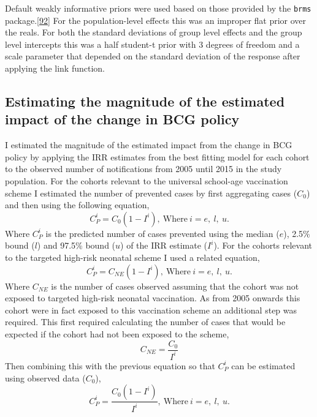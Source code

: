 \documentclass[11pt,twoside]{bristolthesis}
\begin{document}
  Default weakly informative priors were used based on those provided by the \texttt{brms} package.{[}\protect\hyperlink{ref-Burkner}{92}{]} For the population-level effects this was an improper flat prior over the reals. For both the standard deviations of group level effects and the group level intercepts this was a half student-t prior with 3 degrees of freedom and a scale parameter that depended on the standard deviation of the response after applying the link function.
  
  \hypertarget{magnitude-estimation}{%
  \subsection{Estimating the magnitude of the estimated impact of the change in BCG policy}\label{magnitude-estimation}}
  
  I estimated the magnitude of the estimated impact from the change in BCG policy by applying the IRR estimates from the best fitting model for each cohort to the observed number of notifications from 2005 until 2015 in the study population. For the cohorts relevant to the universal school-age vaccination scheme I estimated the number of prevented cases by first aggregating cases (\(C_0\)) and then using the following equation,
  \begin{equation}
  C^i_P = C_0 (1 - I^i),\ \text{Where}\ i = e,\ l,\ u.
  \end{equation}
  Where \(C^i_P\) is the predicted number of cases prevented using the median (\(e\)), 2.5\% bound (\(l\)) and 97.5\% bound (\(u\)) of the IRR estimate (\(I^i\)). For the cohorts relevant to the targeted high-risk neonatal scheme I used a related equation,
  \begin{equation}
  C^i_P = C_{NE}(1 - I^i),\ \text{Where}\ i = e,\ l,\ u.
  \end{equation}
  Where \(C_{NE}\) is the number of cases observed assuming that the cohort was not exposed to targeted high-risk neonatal vaccination. As from 2005 onwards this cohort were in fact exposed to this vaccination scheme an additional step was required. This first required calculating the number of cases that would be expected if the cohort had not been exposed to the scheme,
  \begin{equation}
  C_{NE} = \frac{C_0}{I^i}
  \end{equation}
  Then combining this with the previous equation so that \(C^i_P\) can be estimated using observed data (\(C_0\)),
  \begin{equation}
  C^i_P =  \frac{C_0(1 - I^i)}{I^i},\ \text{Where}\ i = e,\ l,\ u.
  \end{equation}
  \newpage
  
\end{document}
